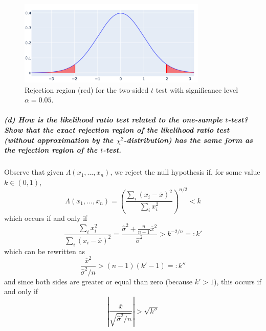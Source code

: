 \documentclass[11pt, english]{article}
\begin{document}
\begin{figure}[H]
	\centering
	\includegraphics[width=0.8\textwidth]{rejectionRegion2}
	\caption{Rejection region (red) for the two-sided $t$ test with significance level $\alpha = 0.05$.}
\end{figure}

    
    \hypertarget{d-how-is-the-likelihood-ratio-test-related-to-the-one-sample-t-test-show-that-the-exact-rejection-region-of-the-likelihood-ratio-test-without-approximation-by-the-chi2-distribution-has-the-same-form-as-the-rejection-region-of-the-t-test.}{%
\subparagraph{\texorpdfstring{(d) How is the likelihood ratio test
related to the one-sample \(t\)-test? Show that the exact rejection
region of the likelihood ratio test (without approximation by the
\(\chi^2\)-distribution) has the same form as the rejection region of
the
\(t\)-test.\\[2ex]}{(d) How is the likelihood ratio test related to the one-sample t-test? Show that the exact rejection region of the likelihood ratio test (without approximation by the \textbackslash chi\^{}2-distribution) has the same form as the rejection region of the t-test.}}\label{d-how-is-the-likelihood-ratio-test-related-to-the-one-sample-t-test-show-that-the-exact-rejection-region-of-the-likelihood-ratio-test-without-approximation-by-the-chi2-distribution-has-the-same-form-as-the-rejection-region-of-the-t-test.}}

    Observe that given \(\Lambda(x_1, \ldots, x_n)\), we reject the null
hypothesis if, for some value \(k \in (0,1)\),
\[\Lambda(x_1, \ldots, x_n) = \left(\frac{\sum_i (x_i - \overline{x})^2}{\sum_i x_i^2} \right)^{n/2} < k\]
which occurs if and only if
\[ \frac{\sum_i x_i^2}{\sum_i (x_i - \overline{x})^2} = \frac{\hat{\sigma}^2 + \frac{n}{n-1}\overline{x}^2}{\hat{\sigma}^2} > k^{-2/n} =: k'\]
which can be rewritten as
\[ \frac{\overline{x}^2}{\hat{\sigma}^2/n} > (n-1)(k'-1) =: k'' \] and
since both sides are greater or equal than zero (because \(k' > 1\)),
this occurs if and only if
\[ \left|\frac{\overline{x}}{\sqrt{\hat{\sigma}^2/n}}\right| > \sqrt{k''}\]
\end{document}
